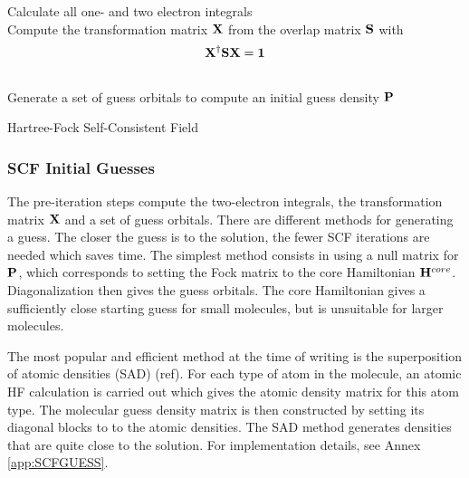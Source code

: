 \begin{algorithm}
Calculate all one- and two electron integrals
\\
Compute the transformation matrix $\mathbf{X}$ from the overlap matrix $\mathbf{S}$ with
\begin{equation}
\mathbf{X}^{\dagger} \mathbf{SX} = \mathbf{1} 
\end{equation}
\\
Generate a set of guess orbitals to compute an initial guess density $\mathbf{P}$
\\
\caption{Hartree-Fock Self-Consistent Field}
\label{algo:SCF}
\end{algorithm}

\subsubsection{SCF Initial Guesses}

The pre-iteration steps compute the two-electron integrals, the transformation matrix $\mathbf{X}$ and a set of guess orbitals. There are different methods for generating a guess. The closer the guess is to the solution, the fewer SCF iterations are needed which saves time. The simplest method consists in using a null matrix for $\mathbf{P}$, which corresponds to setting the Fock matrix to the core Hamiltonian $\mathbf{H}^{core}$. Diagonalization then gives the guess orbitals. The core Hamiltonian gives a sufficiently close starting guess for small molecules, but is unsuitable for larger molecules. 

The most popular and efficient method at the time of writing is the superposition of atomic densities (SAD) (ref). For each type of atom in the molecule, an atomic HF calculation is carried out which gives the atomic density matrix for this atom type. The molecular guess density matrix is then constructed by setting its diagonal blocks to to the atomic densities. The SAD method generates densities that are quite close to the solution. For implementation details, see Annex \ref{app:SCFGUESS}.

